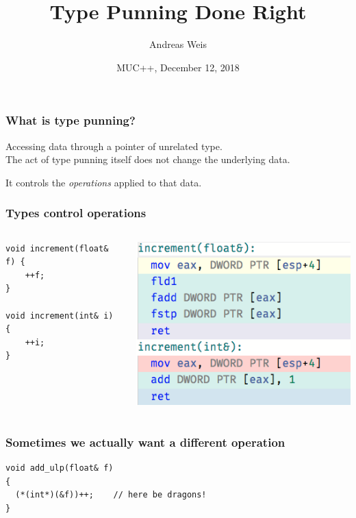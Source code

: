 \documentclass[aspectratio=169]{beamer}
\title{Type Punning Done Right}
\author{Andreas Weis}
\institute{BMW AG}
\date{MUC++, December 12, 2018}
\newif\iftransitions
\begin{document}
\frame{\titlepage}


\begin{frame}[fragile]
  \frametitle{What is type punning?}

  \iftransitions \pause \fi

  Accessing data through a pointer of unrelated type. \\[2ex]

  \iftransitions \pause \fi
   
  The act of type punning itself does not change the underlying data.
  
  It controls the \emph{operations} applied to that data.
\end{frame}


\begin{frame}[fragile]
  \frametitle{Types control operations}
  \setlength{\tabcolsep}{12pt}
  \begin{columns}
 
    \begin{lstlisting}
void increment(float& f) {
    ++f;
}

void increment(int& i) {
    ++i;
}
    \end{lstlisting}
    \iftransitions \pause \fi
    \includegraphics[height=.8\textheight]{resources/increment_float_int.png}
  \end{columns}
\end{frame}


\begin{frame}[fragile]

  \frametitle{Sometimes we actually want a different operation}
  
  \begin{lstlisting}
void add_ulp(float& f)
{
  (*(int*)(&f))++;    // here be dragons!
}
  \end{lstlisting}
\end{frame}
\end{document}
